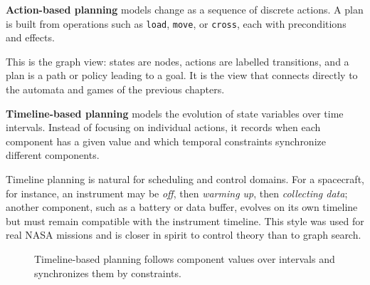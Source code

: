 \begin{definition}
\label{def:action-based-planning}
\textbf{Action-based planning} models change as a sequence of discrete
actions.  A plan is built from operations such as \texttt{load},
\texttt{move}, or \texttt{cross}, each with preconditions and effects.
\end{definition}

This is the graph view: states are nodes, actions are labelled
transitions, and a plan is a path or policy leading to a goal.  It is
the view that connects directly to the automata and games of the
previous chapters.

\begin{definition}
\label{def:timeline-based-planning}
\textbf{Timeline-based planning} models the evolution of state variables
over time intervals.  Instead of focusing on individual actions, it
records when each component has a given value and which temporal
constraints synchronize different components.
\end{definition}

Timeline planning is natural for scheduling and control domains.  For a
spacecraft, for instance, an instrument may be \emph{off}, then
\emph{warming up}, then \emph{collecting data}; another component, such
as a battery or data buffer, evolves on its own timeline but must remain
compatible with the instrument timeline.  This style was used for
real NASA missions and is closer in spirit to control theory than to
graph search.

\begin{figure}[ht]
\centering
{}
\caption{Timeline-based planning follows component values over intervals and synchronizes them by constraints.}
\label{fig:timeline-planning}
\end{figure}

